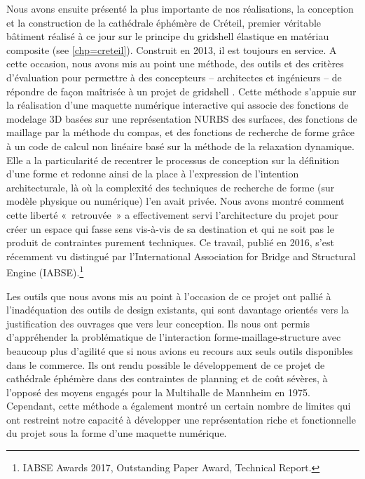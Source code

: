 Nous avons ensuite présenté la plus importante de nos réalisations, la conception et la construction de la cathédrale éphémère de Créteil, premier véritable bâtiment réalisé à ce jour sur le principe du gridshell élastique en matériau composite (see \cref{chp=creteil}). Construit en 2013, il est toujours en service. A cette occasion, nous avons mis au point une méthode, des outils et des critères d’évaluation pour permettre à des concepteurs -- architectes et ingénieurs -- de répondre de façon maîtrisée à un projet de gridshell \cite{DuPeloux2016}. Cette méthode s'appuie sur la réalisation d'une maquette numérique interactive qui associe des fonctions de modelage 3D basées sur une représentation NURBS des surfaces, des fonctions de maillage par la méthode du compas, et des fonctions de recherche de forme grâce à un code de calcul non linéaire basé sur la méthode de la relaxation dynamique. Elle a la particularité de recentrer le processus de conception sur la définition d’une forme et redonne ainsi de la place à l’expression de l’intention architecturale, là où la complexité des techniques de recherche de forme (sur modèle physique ou numérique) l’en avait privée. Nous avons montré comment cette liberté « retrouvée » a effectivement servi l’architecture du projet pour créer un espace qui fasse sens vis-à-vis de sa destination et qui ne soit pas le produit de contraintes purement techniques. Ce travail, publié en 2016, s’est récemment vu distingué par l’International Association for Bridge and Structural Engine (IABSE).\footnote{IABSE Awards 2017, Outstanding Paper Award, Technical Report.}

Les outils que nous avons mis au point à l'occasion de ce projet ont pallié à l’inadéquation des outils de design existants, qui sont davantage orientés vers la justification des ouvrages que vers leur conception. Ils nous ont permis d’appréhender la problématique de l’interaction forme-maillage-structure avec beaucoup plus d’agilité que si nous avions eu recours aux seuls outils disponibles dans le commerce. Ils ont rendu possible le développement de ce projet de cathédrale éphémère dans des contraintes de planning et de coût sévères, à l’opposé des moyens engagés pour la Multihalle de Mannheim en 1975. Cependant, cette méthode a également montré un certain nombre de limites qui ont restreint notre capacité à développer une représentation riche et fonctionnelle du projet sous la forme d'une maquette numérique.

